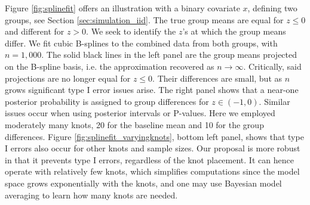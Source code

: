 Figure \ref{fig:splinefit} offers an illustration with
a binary covariate $x$, defining two groups, see Section \ref{sec:simulation_iid}. The true group means are equal for $z \leq 0$ and different for $z>0$. We seek to identify the $z$'s at which the group means differ. We fit cubic B-splines to the combined data from both groups, with $n=1,000$. %
The solid black lines in the left panel are the group means projected on the B-spline basis, i.e.  the approximation recovered as $n \rightarrow \infty$. Critically, said projections are no longer equal for $z \leq 0$. 
Their differences are small, but as $n$ grows significant type I error issues arise. The right panel shows that a near-one posterior probability is assigned to group differences for $z \in (-1,0)$. Similar issues occur when using posterior intervals or P-values. 
Here we employed moderately many knots, 20 for the baseline mean and 10 for the group differences. 
 Figure \ref{fig:splinefit_varyingknots}, bottom left panel, shows that type I errors also occur for other knots and sample sizes.
Our proposal is more robust in that it prevents type I errors, regardless of the knot placement. 
It can hence operate with relatively few knots, 
which simplifies computations since the model space grows exponentially with the knots,
and one may use Bayesian model averaging to learn how many knots are needed.



